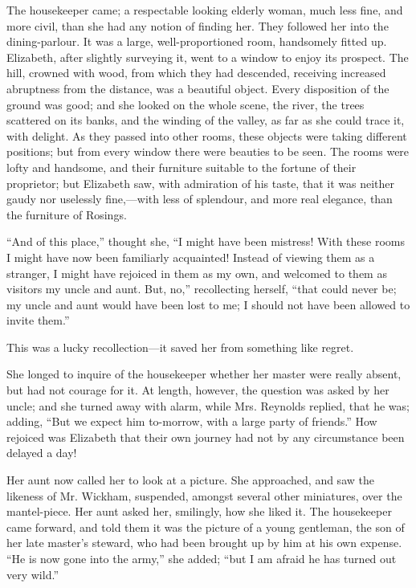 \documentclass[12pt]{book}
\begin{document}
The housekeeper came; a respectable looking elderly woman, much less fine, and more civil, than she had any notion of finding her. They followed her into the dining-parlour. It was a large, well-proportioned room, handsomely fitted up. Elizabeth, after slightly surveying it, went to a window to enjoy its prospect. The hill, crowned with wood, from which they had descended, receiving increased abruptness from the distance, was a beautiful object. Every disposition of the ground was good; and she looked on the whole scene, the river, the trees scattered on its banks, and the winding of the valley, as far as she could trace it, with delight. As they passed into other rooms, these objects were taking different positions; but from every window there were beauties to be seen. The rooms were lofty and handsome, and their furniture suitable to the fortune of their proprietor; but Elizabeth saw, with admiration of his taste, that it was neither gaudy nor uselessly fine,---with less of splendour, and more real elegance, than the furniture of Rosings.

``And of this place,'' thought she, ``I might have been mistress! With these rooms I might have now been familiarly acquainted! Instead of viewing them as a stranger, I might have rejoiced in them as my own, and welcomed to them as visitors my uncle and aunt. But, no,'' recollecting herself, ``that could never be; my uncle and aunt would have been lost to me; I should not have been allowed to invite them.''

This was a lucky recollection---it saved her from something like regret.

She longed to inquire of the housekeeper whether her master were really absent, but had not courage for it. At length, however, the question was asked by her uncle; and she turned away with alarm, while Mrs. Reynolds replied, that he was; adding, ``But we expect him to-morrow, with a large party of friends.'' How rejoiced was Elizabeth that their own journey had not by any circumstance been delayed a day!

Her aunt now called her to look at a picture. She approached, and saw the likeness of Mr. Wickham, suspended, amongst several other miniatures, over the mantel-piece. Her aunt asked her, smilingly, how she liked it. The housekeeper came forward, and told them it was the picture of a young gentleman, the son of her late master's steward, who had been brought up by him at his own expense. ``He is now gone into the army,'' she added; ``but I am afraid he has turned out very wild.''
\end{document}
